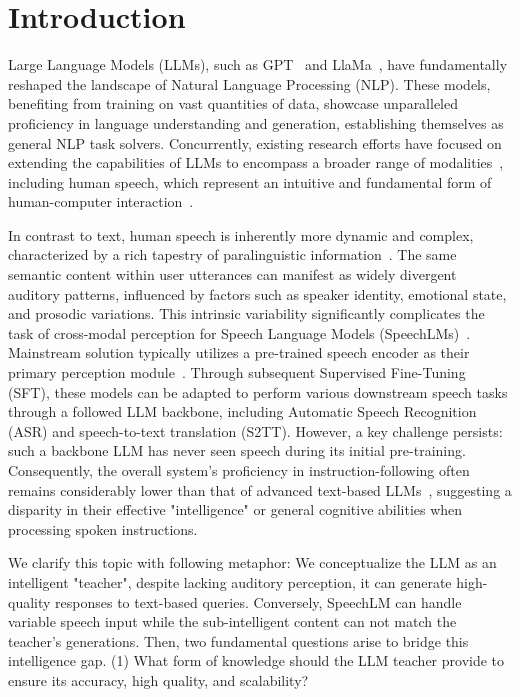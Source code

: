 \documentclass[letterpaper]{article} %
\begin{document}
\section{Introduction}
Large Language Models (LLMs), such as GPT~\cite{achiam2023gpt} and LlaMa~\cite{touvron2023llama}, have fundamentally reshaped the landscape of Natural Language Processing (NLP). These models, benefiting from training on vast quantities of data, showcase unparalleled proficiency in language understanding and generation, establishing themselves as general NLP task solvers. Concurrently, existing research efforts have focused on extending the capabilities of LLMs to encompass a broader range of modalities~\cite{alayrac2022flamingo,lin2023video,zhang2024vision}, including human speech, which represent an intuitive and fundamental form of human-computer interaction~\cite{fang2024llama}. \par
In contrast to text, human speech is inherently more dynamic and complex, characterized by a rich tapestry of paralinguistic information~\cite{lin2024paralinguistics}. The same semantic content within user utterances can manifest as widely divergent auditory patterns, influenced by factors such as speaker identity, emotional state, and prosodic variations. This intrinsic variability significantly complicates the task of cross-modal perception for Speech Language Models (SpeechLMs)~\cite{kim2024paralinguistics}. Mainstream solution typically utilizes a pre-trained speech encoder as their primary perception module~\cite{chu2023qwen}. Through subsequent Supervised Fine-Tuning (SFT), these models can be adapted to perform various downstream speech tasks through a followed LLM backbone, including Automatic Speech Recognition (ASR) and speech-to-text translation (S2TT). However, a key challenge persists: such a backbone LLM has never seen speech during its initial pre-training. Consequently, the overall system's proficiency in instruction-following often remains considerably lower than that of advanced text-based LLMs~\cite{wang2023blsp}, suggesting a disparity in their effective "intelligence" or general cognitive abilities when processing spoken instructions. \par
We clarify this topic with following metaphor: We conceptualize the LLM as an intelligent "teacher", despite lacking auditory perception, it can generate high-quality responses to text-based queries. Conversely, SpeechLM can handle variable speech input while the sub-intelligent content can not match the teacher's generations. Then, two fundamental questions arise to bridge this intelligence gap. (1) What form of knowledge should the LLM teacher provide to ensure its accuracy, high quality, and scalability?
\end{document}
